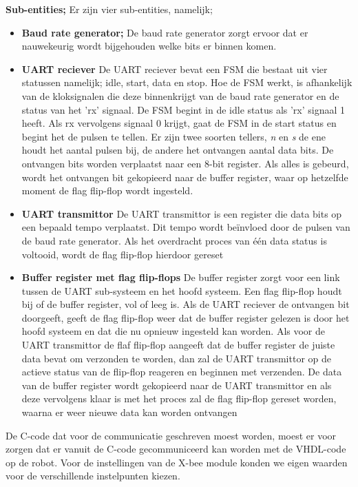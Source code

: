\documentclass{report}
\begin{document}
\textbf{Sub-entities;}
\newline
Er zijn vier sub-entities, namelijk;
\begin{itemize}
\item  \textbf{Baud rate generator;}
\newline
De baud rate generator zorgt ervoor dat er nauwekeurig wordt bijgehouden welke bits er binnen komen.

\item \textbf{UART reciever}
\newline 
De UART reciever bevat een FSM die bestaat uit vier statussen namelijk; idle, start, data en stop.
Hoe de FSM werkt, is afhankelijk van de kloksignalen die deze binnenkrijgt van de baud rate generator en de status van het 'rx' signaal.
De FSM begint in de idle status als 'rx' signaal 1 heeft. Als rx vervolgens signaal 0 krijgt, gaat de FSM in de start status en begint het de pulsen te tellen. Er zijn twee soorten tellers, \textit{n} en \textit{s} de ene houdt het aantal pulsen bij, de andere het ontvangen aantal data bits. De ontvangen bits worden verplaatst naar een 8-bit register. Als alles is gebeurd, wordt het ontvangen bit gekopieerd naar de buffer register, waar op hetzelfde moment de flag flip-flop wordt ingesteld.
 
 \item \textbf{UART transmittor}
 \newline
 De UART transmittor is een register die data bits op een bepaald tempo verplaatst. Dit tempo wordt beïnvloed door de pulsen van de baud rate generator. Als het overdracht proces van één data status is voltooid, wordt de flag flip-flop hierdoor gereset
 
 \item \textbf{Buffer register met flag flip-flops}
 \newline
 De buffer register zorgt voor een link tussen de UART sub-systeem en het hoofd systeem. Een flag flip-flop houdt bij of de buffer register, vol of leeg is.
\newline
Als de UART reciever de ontvangen bit doorgeeft, geeft de flag flip-flop weer dat de buffer register gelezen is door het hoofd systeem en dat die nu opnieuw ingesteld kan worden.
\newline
Als voor de UART transmittor de flaf flip-flop aangeeft dat de buffer register de juiste data bevat om verzonden te worden, dan zal de UART transmittor op de actieve status van de flip-flop reageren en beginnen met verzenden. De data van de buffer register wordt gekopieerd naar de UART transmittor en als deze vervolgens klaar is met het proces zal de flag flip-flop gereset worden, waarna er weer nieuwe data kan worden ontvangen 
 
\end{itemize}
De C-code dat voor de communicatie geschreven moest worden, moest er voor zorgen dat er vanuit de C-code gecommuniceerd kan worden met de VHDL-code op de robot.
\newline
Voor de instellingen van de X-bee module konden we eigen waarden voor de verschillende instelpunten kiezen.
\end{document}
